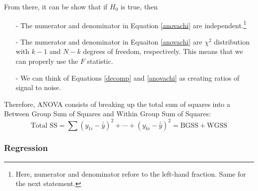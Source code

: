 \documentclass[a4paper,12pt]{scrartcl}
\begin{document}
From there, it can be show that if $H_0$ is true, then
\begin{itemize}
   \item[-] The numerator and denominator in 
      Equation \ref{anovachi} are independent.\footnote{Here,
      numerator and denominator refore to the left-hand fraction.
      Same for the next statement.}
   \item[-] The numerator and denominator in Equaiton 
      \ref{anovachi} are $\chi^2$ distribution
      with $k-1$ and $N-k$ degrees of freedom, respectively. This
      means that we can properly use the $F$ statistic.
   \item[-] We can think of Equations \ref{decomp} and \ref{anovachi}
      as creating ratios of signal to noise.
\end{itemize}
Therefore, ANOVA consists of breaking up the total sum of squares
into a Between Group Sum of Squares and Within Group Sum of Squares:
\[ \text{Total SS} = \sum (y_{1i}-\bar{\bar{y}})^2 + \cdots + 
   (y_{ki}-\bar{\bar{y}})^2
   = \text{BGSS} + \text{WGSS} \]


\newpage
\subsubsection{Regression}
\end{document}
